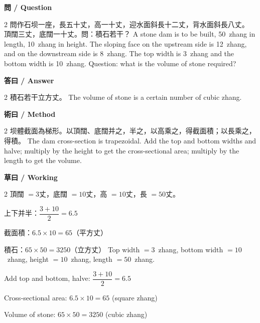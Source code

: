 \documentclass[11pt,a4paper]{article}
\begin{document}
\vspace{0.4em}
\noindent\textbf{\textcolor{chinesecolor}{問} / \textcolor{englishcolor}{Question}}
\vspace{0.3em}
\begin{paracol}{2}
問作石坝一座，長五十丈，高一十丈，迎水面斜長十二丈，背水面斜長八丈。
頂闊三丈，底闊一十丈。問：積石若干？
\switchcolumn
A stone dam is to be built, 50~zhang in length, 10~zhang in height. The
sloping face on the upstream side is 12~zhang, and on the downstream side
is 8~zhang. The top width is 3~zhang and the bottom width is 10~zhang.
Question: what is the volume of stone required?
\end{paracol}

\vspace{0.4em}
\noindent\textbf{\textcolor{chinesecolor}{答曰} / \textcolor{englishcolor}{Answer}}
\vspace{0.2em}
\begin{paracol}{2}
積石若干立方丈。
\switchcolumn
The volume of stone is a certain number of cubic zhang.
\end{paracol}

\vspace{0.4em}
\noindent\textbf{\textcolor{chinesecolor}{術曰} / \textcolor{englishcolor}{Method}}
\vspace{0.2em}
\begin{paracol}{2}
坝體截面為梯形。以頂闊、底闊并之，半之，以高乘之，得截面積；以長乘之，得積。
\switchcolumn
The dam cross-section is trapezoidal. Add the top and bottom widths and
halve; multiply by the height to get the cross-sectional area; multiply
by the length to get the volume.
\end{paracol}

\vspace{0.4em}
\noindent\textbf{\textcolor{chinesecolor}{草曰} / \textcolor{englishcolor}{Working}}
\vspace{0.2em}
\begin{paracol}{2}
頂闊 $=3$丈，底闊 $=10$丈，高 $=10$丈，長 $=50$丈。

上下并半：$\dfrac{3+10}{2} = 6.5$

截面積：$6.5 \times 10 = 65$（平方丈）

積石：$65 \times 50 = 3250$（立方丈）
\switchcolumn
Top width $= 3$~zhang, bottom width $= 10$~zhang, height $= 10$~zhang,
length $= 50$~zhang.

Add top and bottom, halve: $\dfrac{3+10}{2} = 6.5$

Cross-sectional area: $6.5 \times 10 = 65$ (square zhang)

Volume of stone: $65 \times 50 = 3250$ (cubic zhang)
\end{paracol}
\end{document}
